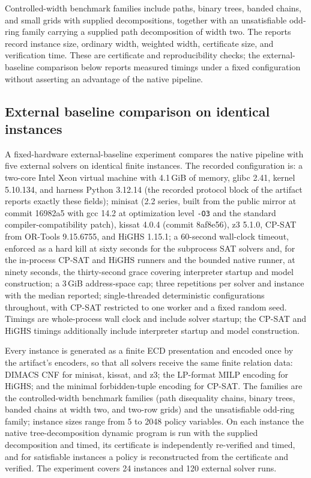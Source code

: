 \documentclass[11pt]{article}
\theoremstyle{plain}
\theoremstyle{definition}
\theoremstyle{remark}
\begin{document}
Controlled-width benchmark families include paths, binary trees,
banded chains, and small grids with supplied decompositions, together with an
unsatisfiable odd-ring family carrying a supplied path decomposition of width
two.  The reports record instance size, ordinary width, weighted width,
certificate size, and verification time.  These are certificate and
reproducibility checks; the external-baseline comparison below reports measured
timings under a fixed configuration without asserting an advantage of the
native pipeline.

\subsection{External baseline comparison on identical instances}
\label{subsec:external-baselines}

A fixed-hardware external-baseline experiment compares the native pipeline with
five external solvers on identical finite instances.  The recorded
configuration is: a two-core Intel Xeon virtual machine with 4.1\,GiB of
memory, glibc 2.41, kernel 5.10.134, and harness
Python 3.12.14 (the recorded protocol block of the artifact reports exactly
these fields); minisat (2.2 series, built from the public mirror at commit
16982a5 with gcc 14.2 at optimization level \texttt{-O3} and the standard
compiler-compatibility patch), kissat 4.0.4 (commit 8af8e56), z3 5.1.0, CP-SAT
from OR-Tools 9.15.6755, and HiGHS 1.15.1; a 60-second wall-clock timeout,
enforced as a hard kill at sixty seconds for the subprocess SAT solvers and,
for the in-process CP-SAT and HiGHS runners and the bounded native runner, at
ninety seconds, the thirty-second grace covering interpreter startup and model
construction; a
3\,GiB address-space cap; three repetitions per solver and instance with the
median reported; single-threaded deterministic configurations throughout, with
CP-SAT restricted to one worker and a fixed random seed.  Timings are
whole-process wall clock and include solver startup; the CP-SAT and HiGHS
timings additionally include interpreter startup and model construction.

Every instance is generated as a finite ECD presentation and encoded once by
the artifact's encoders, so that all solvers receive the same finite relation
data: DIMACS CNF for minisat, kissat, and z3; the LP-format MILP encoding for
HiGHS; and the minimal forbidden-tuple encoding for CP-SAT.  The families are
the controlled-width benchmark families (path disequality chains, binary
trees, banded chains at width two, and two-row grids) and the unsatisfiable
odd-ring family; instance sizes range from 5 to 2048 policy variables.  On each
instance the native tree-decomposition dynamic program is run with the supplied
decomposition and timed, its certificate is independently re-verified and
timed, and for satisfiable instances a policy is reconstructed from the
certificate and verified.  The experiment covers 24 instances and 120 external
solver runs.
\end{document}
